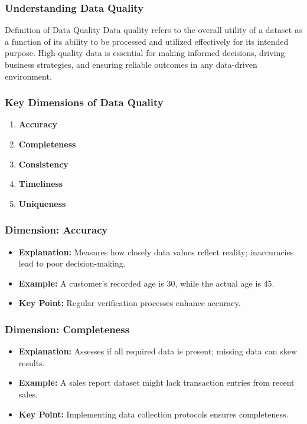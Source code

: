 \documentclass{beamer}
\begin{document}
\begin{frame}[fragile]
    \frametitle{Understanding Data Quality}
    \begin{block}{Definition of Data Quality}
        Data quality refers to the overall utility of a dataset as a function of its ability to be processed and utilized effectively for its intended purpose. High-quality data is essential for making informed decisions, driving business strategies, and ensuring reliable outcomes in any data-driven environment.
    \end{block}
\end{frame}

\begin{frame}[fragile]
    \frametitle{Key Dimensions of Data Quality}
    \begin{enumerate}
        \item \textbf{Accuracy}
        \item \textbf{Completeness}
        \item \textbf{Consistency}
        \item \textbf{Timeliness}
        \item \textbf{Uniqueness}
    \end{enumerate}
\end{frame}

\begin{frame}[fragile]
    \frametitle{Dimension: Accuracy}
    \begin{itemize}
        \item \textbf{Explanation:} Measures how closely data values reflect reality; inaccuracies lead to poor decision-making.
        \item \textbf{Example:} A customer's recorded age is 30, while the actual age is 45.
        \item \textbf{Key Point:} Regular verification processes enhance accuracy.
    \end{itemize}
\end{frame}

\begin{frame}[fragile]
    \frametitle{Dimension: Completeness}
    \begin{itemize}
        \item \textbf{Explanation:} Assesses if all required data is present; missing data can skew results.
        \item \textbf{Example:} A sales report dataset might lack transaction entries from recent sales.
        \item \textbf{Key Point:} Implementing data collection protocols ensures completeness.
    \end{itemize}
\end{frame}
\end{document}
